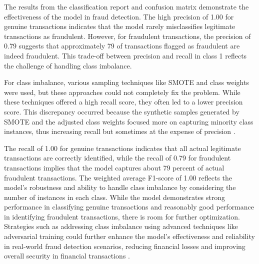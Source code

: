 \documentclass{article}
\begin{document}
The results from the classification report and confusion matrix demonstrate the effectiveness of the model in fraud detection. The high precision of 1.00 for genuine transactions indicates that the model rarely misclassifies legitimate transactions as fraudulent. However, for fraudulent transactions, the precision of 0.79 suggests that approximately 79 of transactions flagged as fraudulent are indeed fraudulent. This trade-off between precision and recall in class 1 reflects the challenge of handling class imbalance. 

For class imbalance, various sampling techniques like SMOTE and class weights were used, but these approaches could not completely fix the problem. While these techniques offered a high recall score, they often led to a lower precision score. This discrepancy occurred because the synthetic samples generated by SMOTE and the adjusted class weights focused more on capturing minority class instances, thus increasing recall but sometimes at the expense of precision \cite{rnd1}. 

The recall of 1.00 for genuine transactions indicates that all actual legitimate transactions are correctly identified, while the recall of 0.79 for fraudulent transactions implies that the model captures about 79 percent of actual fraudulent transactions. The weighted average F1-score of 1.00 reflects the model's robustness and ability to handle class imbalance by considering the number of instances in each class. While the model demonstrates strong performance in classifying genuine transactions and reasonably good performance in identifying fraudulent transactions, there is room for further optimization. Strategies such as addressing class imbalance using advanced techniques like adversarial training could further enhance the model's effectiveness and reliability in real-world fraud detection scenarios, reducing financial losses and improving overall security in financial transactions \cite{rnd2}.

\printbibliography
\end{document}

